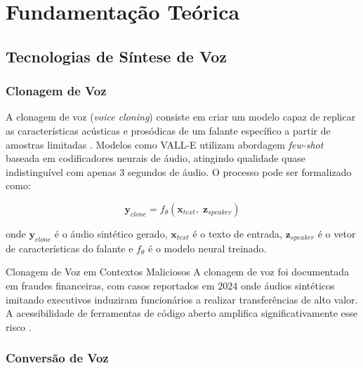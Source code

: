 \documentclass[12pt,a4paper]{article}
\begin{document}
\section{Fundamenta\c{c}\~{a}o Te\'{o}rica}
\label{sec:fundamentacao}

\subsection{Tecnologias de S\'{i}ntese de Voz}

\subsubsection{Clonagem de Voz}

A clonagem de voz (\textit{voice cloning}) consiste em criar um modelo capaz de
replicar as caracter\'{i}sticas ac\'{u}sticas e pros\'{o}dicas de um falante
espec\'{i}fico a partir de amostras limitadas \cite{muller2022warning}.
Modelos como VALL-E \cite{wang2023vall} utilizam abordagem \textit{few-shot}
baseada em codificadores neurais de \'{a}udio, atingindo qualidade quase
indistingu\'{i}vel com apenas 3 segundos de \'{a}udio.
O processo pode ser formalizado como:

\begin{equation}
\mathbf{y}_{clone} = f_{\theta}(\mathbf{x}_{text},\; \mathbf{z}_{speaker})
\end{equation}

onde $\mathbf{y}_{clone}$ \'{e} o \'{a}udio sint\'{e}tico gerado,
$\mathbf{x}_{text}$ \'{e} o texto de entrada, $\mathbf{z}_{speaker}$ \'{e} o
vetor de caracter\'{i}sticas do falante e $f_{\theta}$ \'{e} o modelo neural
treinado.

\begin{infobox}{Clonagem de Voz em Contextos Maliciosos}
A clonagem de voz foi documentada em fraudes financeiras, com casos reportados
em 2024 onde \'{a}udios sint\'{e}ticos imitando executivos induziram
funcion\'{a}rios a realizar transfer\^{e}ncias de alto valor. A acessibilidade
de ferramentas de c\'{o}digo aberto amplifica significativamente esse risco
\cite{pindrop2025}.
\end{infobox}

\subsubsection{Convers\~{a}o de Voz}
\end{document}
